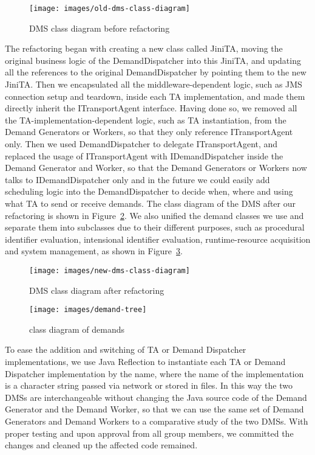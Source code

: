 \documentclass{easychair}
\newcommand{\xf}[1]{Figure~\ref{#1}}
\newcommand{\jms}{{JMS\index{JMS}}}
\begin{document}
	\begin{figure}[htpb!]
	\centering
\texttt{[image: images/old-dms-class-diagram]}
	\caption{DMS class diagram before refactoring}
	\label{fig:old-dms-class-diagram}
	\end{figure}
	
The refactoring began with creating a new class called JiniTA, moving the 
	original business logic of the DemandDispatcher into this JiniTA, and updating
	all the references to the original DemandDispatcher by pointing them to the
	new JiniTA. Then we encapsulated all the middleware-dependent logic, such
	as {\jms} connection setup and teardown, inside each TA implementation, and
	made them directly inherit the ITransportAgent interface. Having done so,
	we removed all the TA-implementation-dependent logic, such as TA instantiation,
	from the Demand Generators or Workers, so that they only reference ITransportAgent
	only. Then we used DemandDispatcher to delegate ITransportAgent, and replaced
	the usage of ITransportAgent with IDemandDispatcher inside the Demand Generator
	and Worker, so that the Demand Generators or Workers now talks to 
	IDemandDispatcher only and in the future we could easily add scheduling logic 
	into the DemandDispatcher to decide when, where and using what TA to send or receive
	demands. The class diagram of the DMS after our refactoring is shown in
	\xf{fig:new-dms-class-diagram}. We also unified the demand classes we use and
	separate them into subclasses due to their different purposes, such as
	procedural identifier evaluation, intensional identifier evaluation, runtime-resource
	acquisition and system management, as shown in \xf{fig:demand-tree}.
	
	\begin{figure}[htpb!]
	\centering
\texttt{[image: images/new-dms-class-diagram]}
	\caption{DMS class diagram after refactoring}
	\label{fig:new-dms-class-diagram}
	\end{figure}
	
	\begin{figure}[htpb!]
	\centering
\texttt{[image: images/demand-tree]}
	\caption{class diagram of demands}
	\label{fig:demand-tree}
	\end{figure}
	
To ease the addition and switching of TA or Demand Dispatcher implementations,
	we use Java Reflection to instantiate each TA or Demand Dispatcher
	implementation by the name, where the name of the implementation is
	a character string passed via network or stored in files. In this way
	the two DMSs are interchangeable without changing the Java source code
	of the Demand Generator and the Demand Worker, so that we can use the 
	same set of Demand Generators and Demand Workers to a comparative
	study of the two DMSs. With proper testing and upon approval from all group members, 
	we committed the changes and cleaned up the affected code remained.
	
\end{document}
